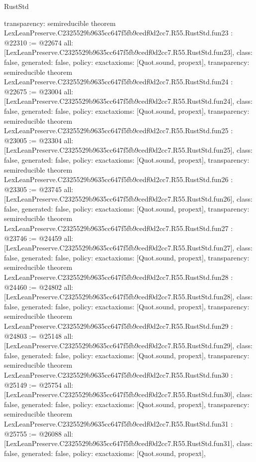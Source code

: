 \begin{lexlean}{RustStd}
\begin{coremodule}
{  transparency: semireducible
}
theorem LexLeanPreserve.C2325529b9635cc647f5fb9cedf0d2cc7.R55.RustStd.fun23 : @22310 := @22674 {
  all: [LexLeanPreserve.C2325529b9635cc647f5fb9cedf0d2cc7.R55.RustStd.fun23],
  class: false,
  generated: false,
  policy: exact{axioms: [Quot.sound, propext]},
  transparency: semireducible
}
theorem LexLeanPreserve.C2325529b9635cc647f5fb9cedf0d2cc7.R55.RustStd.fun24 : @22675 := @23004 {
  all: [LexLeanPreserve.C2325529b9635cc647f5fb9cedf0d2cc7.R55.RustStd.fun24],
  class: false,
  generated: false,
  policy: exact{axioms: [Quot.sound, propext]},
  transparency: semireducible
}
theorem LexLeanPreserve.C2325529b9635cc647f5fb9cedf0d2cc7.R55.RustStd.fun25 : @23005 := @23304 {
  all: [LexLeanPreserve.C2325529b9635cc647f5fb9cedf0d2cc7.R55.RustStd.fun25],
  class: false,
  generated: false,
  policy: exact{axioms: [Quot.sound, propext]},
  transparency: semireducible
}
theorem LexLeanPreserve.C2325529b9635cc647f5fb9cedf0d2cc7.R55.RustStd.fun26 : @23305 := @23745 {
  all: [LexLeanPreserve.C2325529b9635cc647f5fb9cedf0d2cc7.R55.RustStd.fun26],
  class: false,
  generated: false,
  policy: exact{axioms: [Quot.sound, propext]},
  transparency: semireducible
}
theorem LexLeanPreserve.C2325529b9635cc647f5fb9cedf0d2cc7.R55.RustStd.fun27 : @23746 := @24459 {
  all: [LexLeanPreserve.C2325529b9635cc647f5fb9cedf0d2cc7.R55.RustStd.fun27],
  class: false,
  generated: false,
  policy: exact{axioms: [Quot.sound, propext]},
  transparency: semireducible
}
theorem LexLeanPreserve.C2325529b9635cc647f5fb9cedf0d2cc7.R55.RustStd.fun28 : @24460 := @24802 {
  all: [LexLeanPreserve.C2325529b9635cc647f5fb9cedf0d2cc7.R55.RustStd.fun28],
  class: false,
  generated: false,
  policy: exact{axioms: [Quot.sound, propext]},
  transparency: semireducible
}
theorem LexLeanPreserve.C2325529b9635cc647f5fb9cedf0d2cc7.R55.RustStd.fun29 : @24803 := @25148 {
  all: [LexLeanPreserve.C2325529b9635cc647f5fb9cedf0d2cc7.R55.RustStd.fun29],
  class: false,
  generated: false,
  policy: exact{axioms: [Quot.sound, propext]},
  transparency: semireducible
}
theorem LexLeanPreserve.C2325529b9635cc647f5fb9cedf0d2cc7.R55.RustStd.fun30 : @25149 := @25754 {
  all: [LexLeanPreserve.C2325529b9635cc647f5fb9cedf0d2cc7.R55.RustStd.fun30],
  class: false,
  generated: false,
  policy: exact{axioms: [Quot.sound, propext]},
  transparency: semireducible
}
theorem LexLeanPreserve.C2325529b9635cc647f5fb9cedf0d2cc7.R55.RustStd.fun31 : @25755 := @26088 {
  all: [LexLeanPreserve.C2325529b9635cc647f5fb9cedf0d2cc7.R55.RustStd.fun31],
  class: false,
  generated: false,
  policy: exact{axioms: [Quot.sound, propext]},
}
\end{coremodule}
\end{lexlean}
